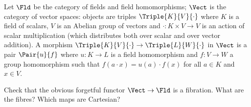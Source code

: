 \begin{exercise}
Let \(\Fld\) be the category of fields and field homomorphisms; \(\Vect\) is the category of vector spaces: objects are triples \(\Triple{K}{V}{\cdot}\) where \(K\) is a field of scalars, \(V\) is an Abelian group of vectors and \(\cdot : K \times V \to V\) is an action of scalar multiplication (which distributes both over scalar and over vector addition).
A morphism \(\Triple{K}{V}{\cdot} \to \Triple{L}{W}{\cdot}\) in \(\Vect\) is a pair \(\Pair{u}{f}\) where \(u : K \to L\) is a field homomorphism and \(f : V \to W\) a group homomorphism such that \(f(a \cdot x) = u(a) \cdot f(x)\) for all \(a \in K\) and \(x \in V\).

Check that the obvious forgetful functor \(\Vect \to \Fld\) is a fibration.
What are the fibres?
Which maps are Cartesian?
\end{exercise}

